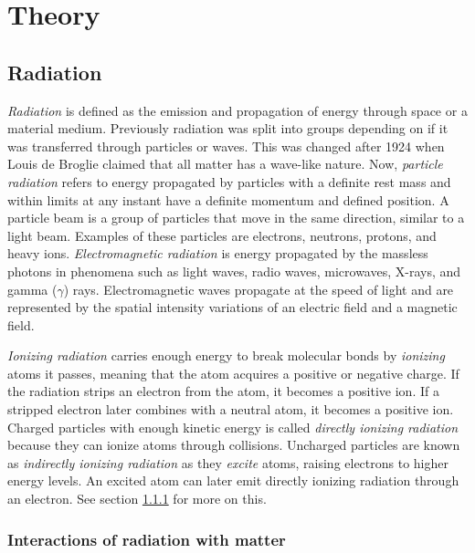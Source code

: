 \documentclass[../main/thesis.tex]{subfiles}
\begin{document}
\newpage

\chapter{Theory}
\label{theory}
\section{Radiation}
\label{t-radiation}
\textit{Radiation} is defined as the emission and propagation of energy through space or a material medium. Previously radiation was split into groups depending on if it was transferred through particles or waves. This was changed after 1924 when Louis de Broglie claimed that all matter has a wave-like nature. Now, \textit{particle radiation} refers to energy propagated by particles with a definite rest mass and within limits at any instant have a definite momentum and defined position. A particle beam is a group of particles that move in the same direction, similar to a light beam. Examples of these particles are electrons, neutrons, protons, and heavy ions. \textit{Electromagnetic radiation} is energy propagated  by the massless photons in phenomena such as light waves, radio waves, microwaves, X-rays, and gamma ($\gamma$) rays. Electromagnetic waves propagate at the speed of light and are represented by the spatial intensity variations of an electric field and a magnetic field. \citep[chap. 1]{Khan} 

\textit{Ionizing radiation} carries enough energy to break molecular bonds by \textit{ionizing} atoms it passes, meaning that the atom acquires a positive or negative charge. If the radiation strips an electron from the atom, it becomes a positive ion. If a stripped electron later combines with a neutral atom, it becomes a positive ion. Charged particles with enough kinetic energy is called \textit{directly ionizing radiation} because they can ionize atoms through collisions. Uncharged particles are known as \textit{indirectly ionizing radiation} as they \textit{excite} atoms, raising electrons to higher energy levels. An excited atom can later emit directly ionizing radiation through an electron. \citep[chap. 5]{Khan} See section \ref{t-int} for more on this.



\subsection{Interactions of radiation with matter}
\label{t-int}
\end{document}
